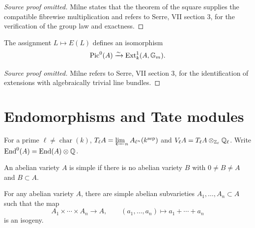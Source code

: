 \begin{proof}[Source proof omitted]
Milne states that the theorem of the square supplies the compatible fibrewise
multiplication and refers to Serre, VII section 3, for the verification of the
group law and exactness.
\end{proof}

\begin{proposition}\label{prop:milne-pic0-ext-classification}
The assignment $L\mapsto E(L)$ defines an isomorphism
\[
\operatorname{Pic}^0(A)\xrightarrow{\sim}\operatorname{Ext}^1_k(A,\mathbb{G}_m).
\]
\end{proposition}

\begin{proof}[Source proof omitted]
Milne refers to Serre, VII section 3, for the identification of extensions
with algebraically trivial line bundles.
\end{proof}

\section{Endomorphisms and Tate modules}

\begin{definition}
\label{def:milne-tate-module}

For a prime $\ell\ne\operatorname{char}(k)$,
$T_\ell A=\varprojlim_n A_{\ell^n}(k^{\mathrm{sep}})$ and
$V_\ell A=T_\ell A\otimes_{\mathbb{Z}_\ell}\mathbb{Q}_\ell$.  Write
$\operatorname{End}^0(A)=\operatorname{End}(A)\otimes\mathbb{Q}$.
\end{definition}

\begin{definition}
\label{def:milne-simple-abelian-variety}

An abelian variety $A$ is simple if there is no abelian variety $B$ with
$0\ne B\ne A$ and $B\subset A$.
\end{definition}

\begin{proposition}
\label{prop:milne-simple-isogeny-decomposition}

For any abelian variety $A$, there are simple abelian subvarieties
$A_1,\ldots,A_n\subset A$ such that the map
\[
A_1\times\cdots\times A_n\longrightarrow A,
\qquad (a_1,\ldots,a_n)\longmapsto a_1+\cdots+a_n
\]
is an isogeny.
\end{proposition}

